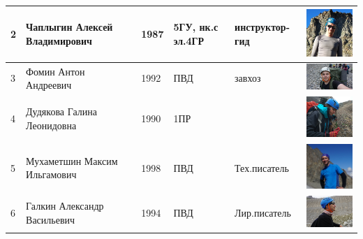 \documentclass[]{article}
\begin{document}
\begin{center}
\begin{longtable}{|m{0.3cm}|m{3cm}|m{0.7cm}|m{1cm}|m{2cm}|m{4cm}|}
			2 &Чаплыгин Алексей Владимирович&1987&5ГУ, нк.с эл.4ГР&инструктор-гид&
			\includegraphics[width=4cm]{Chapa}\\
			\hline
			3 &Фомин Антон Андреевич&1992&ПВД&завхоз&
			\includegraphics[width=4cm]{Anton_F}\\
			\hline
			4 &Дудякова Галина Леонидовна&1990&1ПР&&
			\includegraphics[width=4cm]{Gala}\\
			\hline
			5 &Мухаметшин Максим Ильгамович&1998&ПВД&Тех.писатель&
			\includegraphics[width=4cm]{Max_M}\\
			\hline
			6 &Галкин Александр Васильевич&1994&ПВД&Лир.писатель&
			\includegraphics[width=4cm]{Alex}\\
			\hline
			

\end{longtable}
\end{center}
\end{document}
